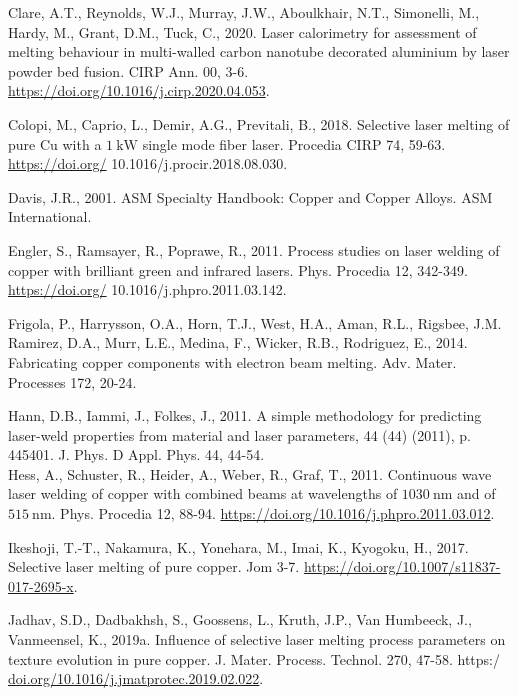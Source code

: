 \documentclass[10pt]{article}
\begin{document}
Clare, A.T., Reynolds, W.J., Murray, J.W., Aboulkhair, N.T., Simonelli, M., Hardy, M., Grant, D.M., Tuck, C., 2020. Laser calorimetry for assessment of melting behaviour in multi-walled carbon nanotube decorated aluminium by laser powder bed fusion. CIRP Ann. 00, 3-6. \href{https://doi.org/10.1016/j.cirp.2020.04.053}{https://doi.org/10.1016/j.cirp.2020.04.053}.

Colopi, M., Caprio, L., Demir, A.G., Previtali, B., 2018. Selective laser melting of pure $\mathrm{Cu}$ with a $1 \mathrm{~kW}$ single mode fiber laser. Procedia CIRP 74, 59-63. \href{https://doi.org/}{https://doi.org/} 10.1016/j.procir.2018.08.030.

Davis, J.R., 2001. ASM Specialty Handbook: Copper and Copper Alloys. ASM International.

Engler, S., Ramsayer, R., Poprawe, R., 2011. Process studies on laser welding of copper with brilliant green and infrared lasers. Phys. Procedia 12, 342-349. \href{https://doi.org/}{https://doi.org/} 10.1016/j.phpro.2011.03.142.

Frigola, P., Harrysson, O.A., Horn, T.J., West, H.A., Aman, R.L., Rigsbee, J.M. Ramirez, D.A., Murr, L.E., Medina, F., Wicker, R.B., Rodriguez, E., 2014. Fabricating copper components with electron beam melting. Adv. Mater. Processes 172, 20-24.

Hann, D.B., Iammi, J., Folkes, J., 2011. A simple methodology for predicting laser-weld properties from material and laser parameters, 44 (44) (2011), p. 445401. J. Phys. D Appl. Phys. 44, 44-54.\\
Hess, A., Schuster, R., Heider, A., Weber, R., Graf, T., 2011. Continuous wave laser welding of copper with combined beams at wavelengths of $1030 \mathrm{~nm}$ and of $515 \mathrm{~nm}$. Phys. Procedia 12, 88-94. \href{https://doi.org/10.1016/j.phpro.2011.03.012}{https://doi.org/10.1016/j.phpro.2011.03.012}.

Ikeshoji, T.-T., Nakamura, K., Yonehara, M., Imai, K., Kyogoku, H., 2017. Selective laser melting of pure copper. Jom 3-7. \href{https://doi.org/10.1007/s11837-017-2695-x}{https://doi.org/10.1007/s11837-017-2695-x}.

Jadhav, S.D., Dadbakhsh, S., Goossens, L., Kruth, J.P., Van Humbeeck, J., Vanmeensel, K., 2019a. Influence of selective laser melting process parameters on texture evolution in pure copper. J. Mater. Process. Technol. 270, 47-58. https:/ \href{http://doi.org/10.1016/j.jmatprotec.2019.02.022}{doi.org/10.1016/j.jmatprotec.2019.02.022}.
\end{document}
